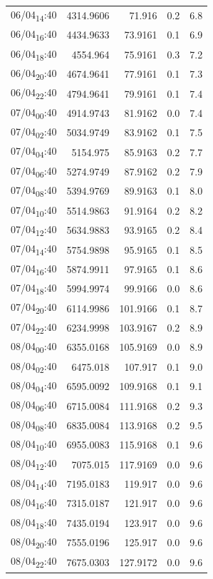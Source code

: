\documentclass[11pt]{article}
\begin{document}
\begin{center}
\begin{tabular}{lrrrr}
06/04\textsubscript{14}:40 & 4314.9606 & 71.916 & 0.2 & 6.8\\[0pt]
06/04\textsubscript{16}:40 & 4434.9633 & 73.9161 & 0.1 & 6.9\\[0pt]
06/04\textsubscript{18}:40 & 4554.964 & 75.9161 & 0.3 & 7.2\\[0pt]
06/04\textsubscript{20}:40 & 4674.9641 & 77.9161 & 0.1 & 7.3\\[0pt]
06/04\textsubscript{22}:40 & 4794.9641 & 79.9161 & 0.1 & 7.4\\[0pt]
07/04\textsubscript{00}:40 & 4914.9743 & 81.9162 & 0.0 & 7.4\\[0pt]
07/04\textsubscript{02}:40 & 5034.9749 & 83.9162 & 0.1 & 7.5\\[0pt]
07/04\textsubscript{04}:40 & 5154.975 & 85.9163 & 0.2 & 7.7\\[0pt]
07/04\textsubscript{06}:40 & 5274.9749 & 87.9162 & 0.2 & 7.9\\[0pt]
07/04\textsubscript{08}:40 & 5394.9769 & 89.9163 & 0.1 & 8.0\\[0pt]
07/04\textsubscript{10}:40 & 5514.9863 & 91.9164 & 0.2 & 8.2\\[0pt]
07/04\textsubscript{12}:40 & 5634.9883 & 93.9165 & 0.2 & 8.4\\[0pt]
07/04\textsubscript{14}:40 & 5754.9898 & 95.9165 & 0.1 & 8.5\\[0pt]
07/04\textsubscript{16}:40 & 5874.9911 & 97.9165 & 0.1 & 8.6\\[0pt]
07/04\textsubscript{18}:40 & 5994.9974 & 99.9166 & 0.0 & 8.6\\[0pt]
07/04\textsubscript{20}:40 & 6114.9986 & 101.9166 & 0.1 & 8.7\\[0pt]
07/04\textsubscript{22}:40 & 6234.9998 & 103.9167 & 0.2 & 8.9\\[0pt]
08/04\textsubscript{00}:40 & 6355.0168 & 105.9169 & 0.0 & 8.9\\[0pt]
08/04\textsubscript{02}:40 & 6475.018 & 107.917 & 0.1 & 9.0\\[0pt]
08/04\textsubscript{04}:40 & 6595.0092 & 109.9168 & 0.1 & 9.1\\[0pt]
08/04\textsubscript{06}:40 & 6715.0084 & 111.9168 & 0.2 & 9.3\\[0pt]
08/04\textsubscript{08}:40 & 6835.0084 & 113.9168 & 0.2 & 9.5\\[0pt]
08/04\textsubscript{10}:40 & 6955.0083 & 115.9168 & 0.1 & 9.6\\[0pt]
08/04\textsubscript{12}:40 & 7075.015 & 117.9169 & 0.0 & 9.6\\[0pt]
08/04\textsubscript{14}:40 & 7195.0183 & 119.917 & 0.0 & 9.6\\[0pt]
08/04\textsubscript{16}:40 & 7315.0187 & 121.917 & 0.0 & 9.6\\[0pt]
08/04\textsubscript{18}:40 & 7435.0194 & 123.917 & 0.0 & 9.6\\[0pt]
08/04\textsubscript{20}:40 & 7555.0196 & 125.917 & 0.0 & 9.6\\[0pt]
08/04\textsubscript{22}:40 & 7675.0303 & 127.9172 & 0.0 & 9.6\\[0pt]
\end{tabular}
\end{center}
\end{document}
